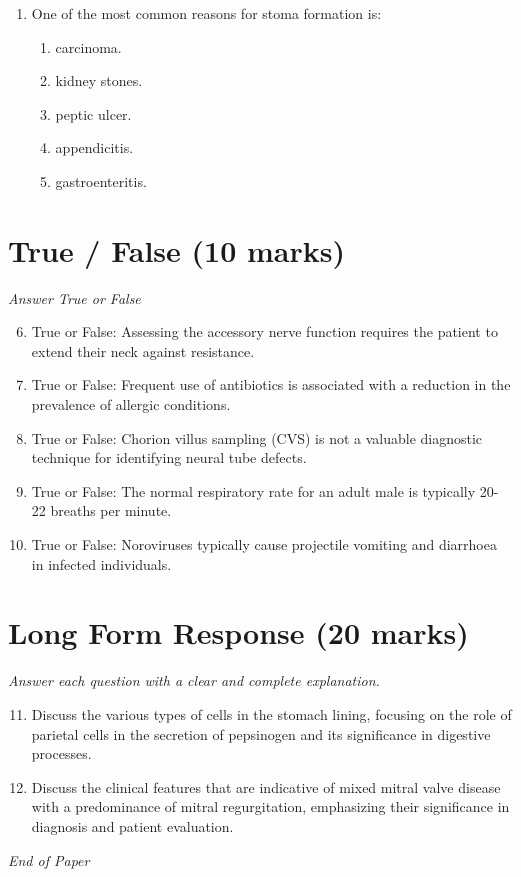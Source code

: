 \documentclass[12pt]{article}
\begin{document}
\begin{enumerate}[label=\arabic*.]
\begin{enumerate}[label=(\alph*)]
    \item Reptiles
    \item Birds
    \item Primates
    \item Humans
    \item Cattle
\end{enumerate}
\item One of the most common reasons for stoma formation is:
\begin{enumerate}[label=(\alph*)]
    \item carcinoma.
    \item kidney stones.
    \item peptic ulcer.
    \item appendicitis.
    \item gastroenteritis.
\end{enumerate}
\end{enumerate}

\section*{True / False (10 marks)}
\textit{Answer True or False}
\begin{enumerate}[label=\arabic*.]
\setcounter{enumi}{5}
\item True or False: Assessing the accessory nerve function requires the patient to extend their neck against resistance.
\item True or False: Frequent use of antibiotics is associated with a reduction in the prevalence of allergic conditions.
\item True or False: Chorion villus sampling (CVS) is not a valuable diagnostic technique for identifying neural tube defects.
\item True or False: The normal respiratory rate for an adult male is typically 20-22 breaths per minute.
\item True or False: Noroviruses typically cause projectile vomiting and diarrhoea in infected individuals.
\end{enumerate}

\section*{Long Form Response (20 marks)}
\textit{Answer each question with a clear and complete explanation.}
\begin{enumerate}[label=\arabic*.]
\setcounter{enumi}{10}
\item Discuss the various types of cells in the stomach lining, focusing on the role of parietal cells in the secretion of pepsinogen and its significance in digestive processes.
\item Discuss the clinical features that are indicative of mixed mitral valve disease with a predominance of mitral regurgitation, emphasizing their significance in diagnosis and patient evaluation.
\end{enumerate}

\vfill
\noindent\textit{End of Paper}
\end{document}
